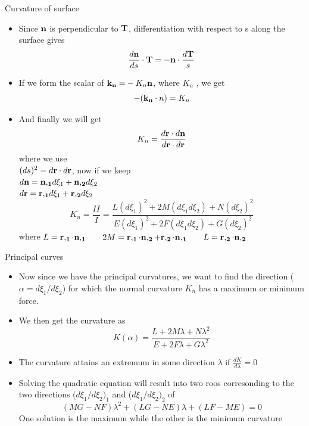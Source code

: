 	\begin{frame}{Curvature of surface}
		\begin{itemize}
			\item Since $\mathbf{n}$ is perpendicular to $\mathbf{T}$, differentiation with respect to s along the surface gives
			\begin{equation}
			\frac{d \mathbf{n}}{ds} \cdot \mathbf{T} = -\mathbf{n}\cdot \frac{d \mathbf{T}}{s}
			\end{equation}
			\item If we form the scalar of $\mathbf{k_n =} -K_n \mathbf{n}$, where $K_n$ , we get
			\begin{equation}
			-(\mathbf{k_n}\cdot n) = K_n
			\end{equation}
			\item And finally we will get 
			\begin{equation}
			K_n = \frac{d\mathbf{r}\cdot d\mathbf{n}}{d\mathbf{r}\cdot d\mathbf{r}}
			\end{equation}
			where we use\\
			$(ds)^2 = d\mathbf{r}\cdot d\mathbf{r}$, now if we keep \\ 
			$d\mathbf{n} = \mathbf{n,_1}d\xi_1 + \mathbf{n,_2}d\xi_2$ \\
			$d\mathbf{r} = \mathbf{r,_1}d\xi_1 + \mathbf{r,_2}d\xi_2$
			\begin{equation}
			K_n = \frac{II}{I} = \frac{L (d\xi_1)^2 + 2M (d\xi_1d\xi_2) + N (d\xi_2)^2}{E (d\xi_1)^2 + 2F (d\xi_1d\xi_2) + G (d\xi_2)^2}
			\end{equation}
			where $L = \mathbf{r,_1 \cdot n,_1} \qquad 2M = \mathbf{r,_1 \cdot n,_2 + r,_2 \cdot n,_1 } \qquad L = \mathbf{r,_2 \cdot n,_2}$
		\end{itemize}
	\end{frame}


	\begin{frame}{Principal curves}
		\begin{itemize}
			\item Now since we have the principal curvatures, we want to find the direction ($\alpha = d\xi_1/d\xi_2$) for which the normal curvature $K_n$ has a maximum or minimum force. 
			\item We then get the curvature as
			\begin{equation}
			K(\alpha) = \frac{L + 2M \lambda + N\lambda^2}
			                 {E + 2F \lambda + G\lambda^2}
			\end{equation}
			\item The curvature attains an extremum in some direction $\lambda$ if $\frac{dK}{d\lambda} = 0$
			\item Solving the quadratic equation will result into two roos corresonding to the two directions ($d\xi_1/d\xi_2)_1$ and ($d\xi_1/d\xi_2)_2$ of
			\begin{equation}
			(MG-NF)\lambda^2 + (LG-NE)\lambda + (LF-ME)  = 0
			\end{equation}
			One solution is the maximum while the other is the minimum curvature
		\end{itemize}
	\end{frame}



